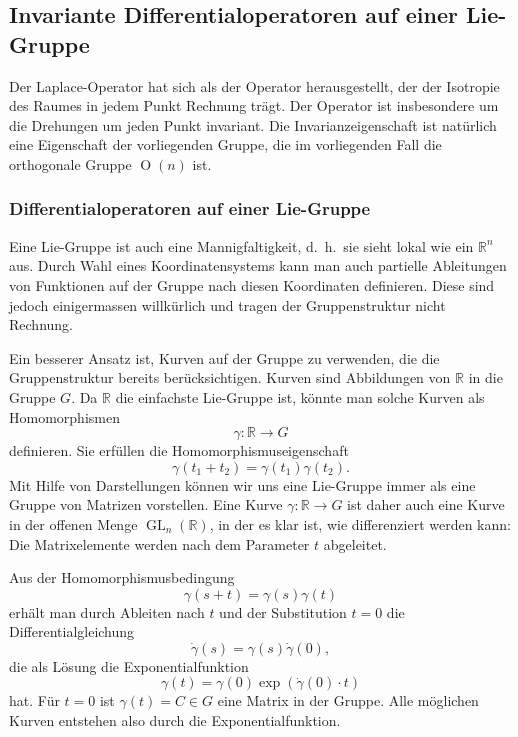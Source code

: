 %
%
\subsection{Invariante Differentialoperatoren auf einer Lie-Gruppe}
Der Laplace-Operator hat sich als der Operator herausgestellt, der
der Isotropie des Raumes in jedem Punkt Rechnung trägt.
Der Operator ist insbesondere um die Drehungen um jeden Punkt
invariant.
Die Invarianzeigenschaft ist natürlich eine Eigenschaft der 
vorliegenden Gruppe, die im vorliegenden Fall die
orthogonale Gruppe $\operatorname{O}(n)$ ist.

%
%
\subsubsection{Differentialoperatoren auf einer Lie-Gruppe}
Eine Lie-Gruppe ist auch eine Mannigfaltigkeit, d.~h.~sie sieht lokal
wie ein $\mathbb{R}^n$ aus.
Durch Wahl eines Koordinatensystems kann man auch partielle
Ableitungen von Funktionen auf der Gruppe nach diesen Koordinaten
definieren.
Diese sind jedoch einigermassen willkürlich und tragen der
Gruppenstruktur nicht Rechnung.

Ein besserer Ansatz ist, Kurven auf der Gruppe zu verwenden, die
die Gruppenstruktur bereits berücksichtigen.
Kurven sind Abbildungen von $\mathbb{R}$ in die Gruppe $G$.
Da $\mathbb{R}$ die einfachste Lie-Gruppe ist, könnte man solche
Kurven als Homomorphismen
\[
\gamma
\colon
\mathbb{R} \to  G
\]
definieren.
Sie erfüllen die Homomorphismuseigenschaft
\[
\gamma(t_1+t_2) = \gamma(t_1)\gamma(t_2).
\]
Mit Hilfe von Darstellungen können wir uns eine Lie-Gruppe immer als
eine Gruppe von Matrizen vorstellen.
Eine Kurve $\gamma\colon \mathbb{R}\to G$ ist daher auch eine Kurve in
der offenen Menge $\operatorname{GL}_n(\mathbb{R})$, in der es klar ist,
wie differenziert werden kann:
Die Matrixelemente werden nach dem Parameter $t$ abgeleitet.

Aus der Homomorphismusbedingung
\begin{equation}
\gamma(s+t)=\gamma(s)\gamma(t)
\label{buch:operatoren:casimir:eqn:homomorph}
\end{equation}
erhält man durch Ableiten nach $t$ und der Substitution $t=0$ die 
Differentialgleichung
\[
\dot{\gamma}(s) = \gamma(s) \dot{\gamma}(0),
\]
die als Lösung die Exponentialfunktion
\[
\gamma(t) = \gamma(0) \exp(\dot{\gamma}(0)\cdot t)
\]
hat.
Für $t=0$ ist $\gamma(t)=C\in G$ eine Matrix in der Gruppe.
Alle möglichen Kurven entstehen also durch die Exponentialfunktion.

